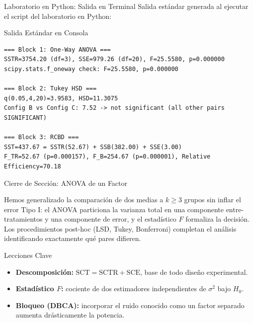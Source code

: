 \documentclass[10pt, aspectratio=169]{beamer}
\begin{document}
\begin{frame}[fragile]{Laboratorio en Python: Salida en Terminal}
  \scriptsize
  Salida estándar generada al ejecutar el script del laboratorio en Python:
  \vspace{0.02cm}
  \begin{block}{Salida Estándar en Consola}
    \fontsize{3.8pt}{4.6pt}\selectfont
    \begin{verbatim}
=== Block 1: One-Way ANOVA ===
SSTR=3754.20 (df=3), SSE=979.26 (df=20), F=25.5580, p=0.000000
scipy.stats.f_oneway check: F=25.5580, p=0.000000

=== Block 2: Tukey HSD ===
q(0.05,4,20)=3.9583, HSD=11.3075
Config B vs Config C: 7.52 -> not significant (all other pairs SIGNIFICANT)

=== Block 3: RCBD ===
SST=437.67 = SSTR(52.67) + SSB(382.00) + SSE(3.00)
F_TR=52.67 (p=0.000157), F_B=254.67 (p=0.000001), Relative Efficiency=70.18
    \end{verbatim}
  \end{block}
\end{frame}

\begin{frame}{Cierre de Sección: ANOVA de un Factor}
  \begin{reflexion}
    Hemos generalizado la comparación de dos medias a $k\geq3$ grupos sin inflar el error Tipo I: el ANOVA particiona la varianza total en una componente entre-tratamientos y una componente de error, y el estadístico $F$ formaliza la decisión. Los procedimientos post-hoc (LSD, Tukey, Bonferroni) completan el análisis identificando exactamente qué pares difieren.
  \end{reflexion}

  \vspace{0.2cm}
  \pause
  \begin{block}{Lecciones Clave}
    \begin{itemize}\itemsep=0.08cm
      \item \textbf{Descomposición:} $\text{SCT}=\text{SCTR}+\text{SCE}$, base de todo diseño experimental.
      \item \textbf{Estadístico $F$:} cociente de dos estimadores independientes de $\sigma^2$ bajo $H_0$.
      \item \textbf{Bloqueo (DBCA):} incorporar el ruido conocido como un factor separado aumenta drásticamente la potencia.
    \end{itemize}
  \end{block}
\end{frame}
\end{document}
